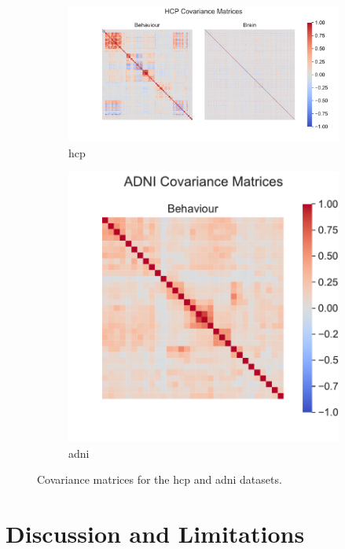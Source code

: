 \begin{figure}
\centering
\begin{subfigure}{0.66\linewidth}
\centering
\includegraphics[width=\linewidth]{figures/covariance/hcp_covariance}
\caption{\acrshort{hcp}}
\end{subfigure}
%
\begin{subfigure}{0.33\linewidth}
\centering
\includegraphics[width=\linewidth]{figures/covariance/adni_covariance}
\caption{\acrshort{adni}}
\end{subfigure}
\caption{Covariance matrices for the \acrshort{hcp} and \acrshort{adni} datasets.}
\label{fig:covariance-matrices-real}
\end{figure}
\newpage
\section{Discussion and Limitations}

